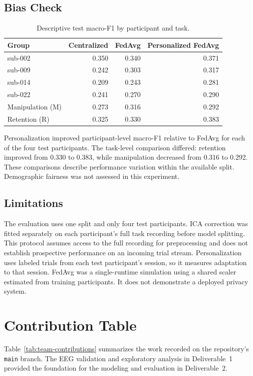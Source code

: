 \documentclass[11pt,a4paper]{article}
\begin{document}
\subsection{Bias Check}
\begin{table}[H]
\centering
\caption{Descriptive test macro-F1 by participant and task.}
\label{tab:bias-check}
\begin{tabular}{lrrr}
\toprule
Group & Centralized & FedAvg & Personalized FedAvg \\
\midrule
sub-002 & 0.350 & 0.340 & 0.371 \\
sub-009 & 0.242 & 0.303 & 0.317 \\
sub-014 & 0.209 & 0.243 & 0.281 \\
sub-022 & 0.241 & 0.270 & 0.290 \\
\midrule
Manipulation (M) & 0.273 & 0.316 & 0.292 \\
Retention (R) & 0.325 & 0.330 & 0.383 \\
\bottomrule
\end{tabular}
\end{table}

Personalization improved participant-level macro-F1 relative to FedAvg
for each of the four test participants. The task-level comparison
differed: retention improved from 0.330 to 0.383, while manipulation
decreased from 0.316 to 0.292. These comparisons describe performance
variation within the available split. Demographic fairness was not
assessed in this experiment.

\subsection{Limitations}
The evaluation uses one split and only four test participants.
ICA correction was fitted separately on each participant's full task
recording before model splitting. This protocol assumes access to the
full recording for preprocessing and does not establish prospective
performance on an incoming trial stream. Personalization uses labeled
trials from each test participant's session, so it measures adaptation
to that session. FedAvg was a single-runtime simulation using a shared
scaler estimated from training participants. It does not demonstrate
a deployed privacy system.

\section{Contribution Table}
Table~\ref{tab:team-contributions} summarizes the work recorded on the
repository's \texttt{main} branch. The EEG validation and exploratory
analysis in Deliverable~1 provided the foundation for the modeling
and evaluation in Deliverable~2.
\end{document}
